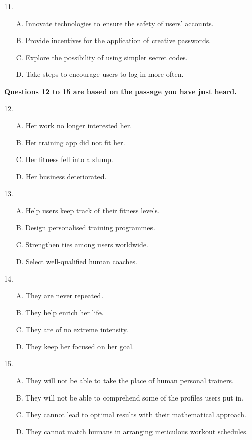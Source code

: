 \documentclass[UTF8,11pt]{ctexart}
\begin{document}
11.


\begin{itemize}[leftmargin=2em,itemsep=.2em,topsep=.4em]\item[A.] Innovate technologies to ensure the safety of users’ accounts.
\item[B.] Provide incentives for the application of creative passwords.
\item[C.] Explore the possibility of using simpler secret codes.
\item[D.] Take steps to encourage users to log in more often.
\end{itemize}

\textbf{Questions 12 to 15 are based on the passage you have just heard.}


12.


\begin{itemize}[leftmargin=2em,itemsep=.2em,topsep=.4em]\item[A.] Her work no longer interested her.
\item[B.] Her training app did not fit her.
\item[C.] Her fitness fell into a slump.
\item[D.] Her business deteriorated.
\end{itemize}

13.


\begin{itemize}[leftmargin=2em,itemsep=.2em,topsep=.4em]\item[A.] Help users keep track of their fitness levels.
\item[B.] Design personalised training programmes.
\item[C.] Strengthen ties among users worldwide.
\item[D.] Select well-qualified human coaches.
\end{itemize}

14.


\begin{itemize}[leftmargin=2em,itemsep=.2em,topsep=.4em]\item[A.] They are never repeated.
\item[B.] They help enrich her life.
\item[C.] They are of no extreme intensity.
\item[D.] They keep her focused on her goal.
\end{itemize}

15.


\begin{itemize}[leftmargin=2em,itemsep=.2em,topsep=.4em]\item[A.] They will not be able to take the place of human personal trainers.
\item[B.] They will not be able to comprehend some of the profiles users put in.
\item[C.] They cannot lead to optimal results with their mathematical approach.
\item[D.] They cannot match humans in arranging meticulous workout schedules.
\end{itemize}
\end{document}
